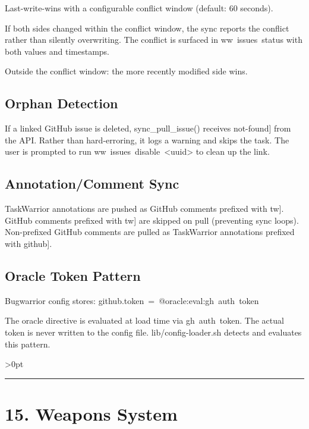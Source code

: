 \documentclass[11pt, a4paper, DIV=14]{scrartcl}
\renewcommand{\texttt}[1]{{\ttfamily\fontsize{8.5}{10.5}\selectfont\color{BabbNavy}#1}}
\let\origRule\rule
\renewcommand{\rule}[3][0pt]{%
  \ifnum\dimexpr#3\relax>0pt
    \par\vspace{2pt}\noindent{\color{BabbBorder}\origRule[#1]{#2}{#3}}\par\vspace{2pt}%
  \else
    \origRule[#1]{#2}{#3}%
  \fi
}
\begin{document}
Last-write-wins with a configurable conflict window (default: 60
seconds).

If both sides changed within the conflict window, the sync reports the
conflict rather than silently overwriting. The conflict is surfaced in
\texttt{ww\ issues\ status} with both values and timestamps.

Outside the conflict window: the more recently modified side wins.

\subsection{Orphan Detection}\label{orphan-detection}

If a linked GitHub issue is deleted, \texttt{sync\_pull\_issue()}
receives \texttt{{[}not-found{]}} from the API. Rather than
hard-erroring, it logs a warning and skips the task. The user is
prompted to run
\texttt{ww\ issues\ disable\ \textless{}uuid\textgreater{}} to clean up
the link.

\subsection{Annotation/Comment Sync}\label{annotationcomment-sync}

TaskWarrior annotations are pushed as GitHub comments prefixed with
\texttt{{[}tw{]}}. GitHub comments prefixed with \texttt{{[}tw{]}} are
skipped on pull (preventing sync loops). Non-prefixed GitHub comments
are pulled as TaskWarrior annotations prefixed with
\texttt{{[}github{]}}.

\subsection{Oracle Token Pattern}\label{oracle-token-pattern}

Bugwarrior config stores:
\texttt{github.token\ =\ @oracle:eval:gh\ auth\ token}

The oracle directive is evaluated at load time via
\texttt{gh\ auth\ token}. The actual token is never written to the
config file. \texttt{lib/config-loader.sh} detects and evaluates this
pattern.

\begin{center}\rule{0.5\linewidth}{0.5pt}\end{center}

\section{15. Weapons System}\label{weapons-system}
\end{document}
